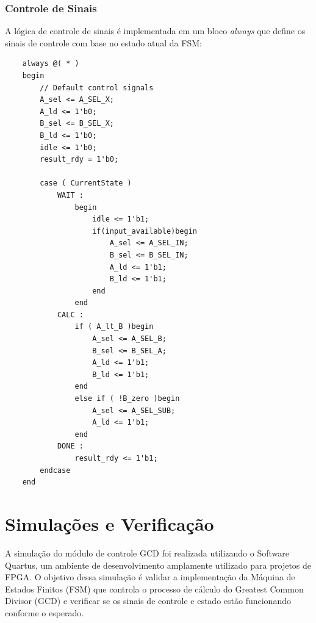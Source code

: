 \documentclass[a4paper,11pt]{article} %
\begin{document}
\subsubsection{Controle de Sinais}

A lógica de controle de sinais é implementada em um bloco \textit{always} que define os sinais de controle com base no estado atual da FSM:

\begin{verbatim}
    always @( * )
    begin
        // Default control signals
        A_sel <= A_SEL_X;
        A_ld <= 1'b0;
        B_sel <= B_SEL_X;
        B_ld <= 1'b0;
        idle <= 1'b0; 
        result_rdy = 1'b0;

        case ( CurrentState )
            WAIT :
                begin
                    idle <= 1'b1; 
                    if(input_available)begin
                        A_sel <= A_SEL_IN;
                        B_sel <= B_SEL_IN;
                        A_ld <= 1'b1;   
                        B_ld <= 1'b1;
                    end
                end
            CALC :
                if ( A_lt_B )begin
                    A_sel <= A_SEL_B;
                    B_sel <= B_SEL_A;
                    A_ld <= 1'b1;
                    B_ld <= 1'b1;
                end
                else if ( !B_zero )begin
                    A_sel <= A_SEL_SUB;
                    A_ld <= 1'b1;
                end
            DONE : 
                result_rdy <= 1'b1;
        endcase
    end
\end{verbatim}

\section{Simulações e Verificação}

A simulação do módulo de controle GCD foi realizada
utilizando o Software Quartus, um ambiente de
desenvolvimento amplamente utilizado para projetos
de FPGA. O objetivo dessa simulação é validar a
implementação da Máquina de Estados Finitos (FSM)
que controla o processo de cálculo do Greatest
Common Divisor (GCD) e verificar se os sinais de
controle e estado estão funcionando conforme o
esperado.
\end{document}
